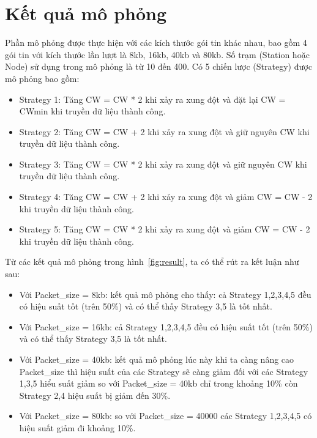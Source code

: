 \chapter{Kết quả mô phỏng}
\label{ch::chapter3}

Phần mô phỏng được thực hiện với các kích thước gói tin khác nhau, bao gồm 4 gói tin với kích thước lần lượt là 8kb, 16kb, 40kb và 80kb. Số trạm (Station hoặc Node) sử dụng trong mô phỏng là từ 10 đến 400.
Có 5 chiến lược (Strategy) được mô phỏng bao gồm:
\begin{itemize}
    \item Strategy 1: Tăng CW = CW * 2 khi xảy ra xung đột và đặt lại CW = CWmin khi truyền dữ liệu thành công.
    \item Strategy 2: Tăng CW = CW + 2 khi xảy ra xung đột và giữ nguyên CW khi truyền dữ liệu thành công.
    \item Strategy 3: Tăng CW = CW * 2 khi xảy ra xung đột và giữ nguyên CW khi truyền dữ liệu thành công.
    \item Strategy 4: Tăng CW = CW + 2 khi xảy ra xung đột và giảm CW = CW - 2 khi truyền dữ liệu thành công.
    \item Strategy 5: Tăng CW = CW * 2 khi xảy ra xung đột và giảm CW = CW - 2 khi truyền dữ liệu thành công.
\end{itemize}

Từ các kết quả mô phỏng trong hình~\ref{fig:result}, ta có thể rút ra kết luận như sau:
\begin{itemize}
    \item Với Packet\_size = 8kb: kết quả mô phỏng cho thấy: cả Strategy 1,2,3,4,5 đều có hiệu suất tốt (trên 50\%) và có thể thấy Strategy 3,5 là tốt nhất.
    \item Với Packet\_size = 16kb: cả Strategy 1,2,3,4,5 đều có hiệu suất tốt (trên 50\%) và có thể thấy Strategy 3,5 là tốt nhất.
    \item Với Packet\_size = 40kb: kết quả mô phỏng lúc này khi ta càng nâng cao Packet\_size thì hiệu suất của các Strategy sẽ càng giảm đối với các Strategy 1,3,5 hiểu suất giảm so với Packet\_size = 40kb chỉ trong khoảng 10\% còn Strategy 2,4 hiệu suất bị giảm đến 30\%.
    \item Với Packet\_size = 80kb: so với Packet\_size = 40000 các Strategy 1,2,3,4,5 có hiệu suất giảm đi khoảng 10\%.
\end{itemize}

